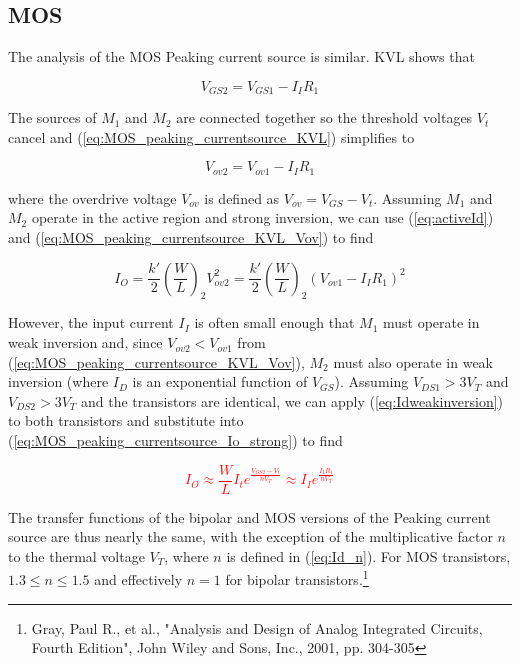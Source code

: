 \subsection{MOS}
The analysis of the MOS Peaking current source is similar. KVL shows that

\begin{equation}
V_{GS2} = V_{GS1} - I_{I}R_{1}
\label{eq:MOS_peaking_currentsource_KVL}
\end{equation}

\noindent The sources of $M_{1}$ and $M_{2}$ are connected together so the threshold voltages $V_{t}$ cancel and (\ref{eq:MOS_peaking_currentsource_KVL}) simplifies to

\begin{equation}
V_{ov2} = V_{ov1} - I_{I}R_{1}
\label{eq:MOS_peaking_currentsource_KVL_Vov}
\end{equation}

\noindent where the overdrive voltage $V_{ov}$ is defined as $V_{ov} = V_{GS} - V_{t}$. Assuming $M_{1}$ and $M_{2}$ operate in the active region and strong inversion, we can use (\ref{eq:activeId}) and (\ref{eq:MOS_peaking_currentsource_KVL_Vov}) to find

\begin{equation}
I_{O} = \frac{k'}{2}\left(\frac{W}{L}\right)_{2}V_{ov2}^{2} = \frac{k'}{2}\left(\frac{W}{L}\right)_{2}(V_{ov1}-I_{I}R_{1})^{2}
\label{eq:MOS_peaking_currentsource_Io_strong}
\end{equation}

\noindent However, the input current $I_{I}$ is often small enough that $M_{1}$ must operate in weak inversion and, since $V_{ov2} < V_{ov1}$ from (\ref{eq:MOS_peaking_currentsource_KVL_Vov}), $M_{2}$ must also operate in weak inversion (where $I_{D}$ is an exponential function of $V_{GS}$). Assuming $V_{DS1} > 3V_{T}$ and $V_{DS2} > 3V_{T}$ and the transistors are identical, we can apply (\ref{eq:Idweakinversion}) to both transistors and substitute into (\ref{eq:MOS_peaking_currentsource_Io_strong}) to find

\textcolor{red}{
\begin{equation}
I_{O} \approx \frac{W}{L}I_{t}e^{\frac{V_{GS2}-V_{t}}{nV_{T}}} \approx I_{I}e^{\frac{I_{I}R_{1}}{nV_{T}}}
\end{equation}
}

The transfer functions of the bipolar and MOS versions of the Peaking current source are thus nearly the same, with the exception of the multiplicative factor $n$ to the thermal voltage $V_{T}$, where $n$ is defined in (\ref{eq:Id_n}). For MOS transistors, $1.3 \leq n \leq 1.5$ and effectively $n = 1$ for bipolar transistors.\footnote{Gray, Paul R., et al., "Analysis and Design of Analog Integrated Circuits, Fourth Edition", John Wiley and Sons, Inc., 2001, pp. 304-305}

